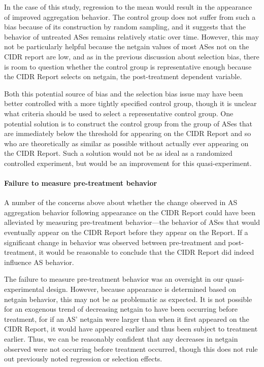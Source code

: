 In the case of this study, regression to the mean would result in the
appearance of improved aggregation behavior. The control group does not suffer
from such a bias because of its construction by random sampling, and it
suggests that the behavior of untreated ASes remains relatively static over
time.  However, this may not be particularly helpful because the netgain values
of most ASes not on the CIDR report are low, and as in the previous discussion
about selection bias, there is room to question whether the control group is
representative enough because the CIDR Report selects on netgain, the
post-treatment dependent variable.

Both this potential source of bias and the selection bias issue may have been
better controlled with a more tightly specified control group, though it is
unclear what criteria should be used to select a representative control group.
One potential solution is to construct the control group from the group of
ASes that are immediately below the threshold for appearing on the CIDR Report
and so who are theoretically as similar as possible without actually ever
appearing on the CIDR Report. Such a solution would not be as ideal as a
randomized controlled experiment, but would be an improvement for this
quasi-experiment.


\paragraph{Failure to measure pre-treatment behavior}

A number of the concerns above about whether the change observed in AS
aggregation behavior following appearance on the CIDR Report could have been
alleviated by measuring pre-treatment behavior---the behavior of ASes that
would eventually appear on the CIDR Report before they appear on the Report. If
a significant change in behavior was observed between pre-treatment and
post-treatment, it would be reasonable to conclude that the CIDR Report did
indeed influence AS behavior.

The failure to measure pre-treatment behavior was an oversight in our
quasi-experimental design. However, because appearance is determined based on
netgain behavior, this may not be as problematic as expected. It is not
possible for an exogenous trend of decreasing netgain to have been occurring
before treatment, for if an AS' netgain were larger than when it first appeared
on the CIDR Report, it would have appeared earlier and thus been subject to
treatment earlier. Thus, we can be reasonably confident that any decreases in
netgain observed were not occurring before treatment occurred, though this
does not rule out previously noted regression or selection effects.

